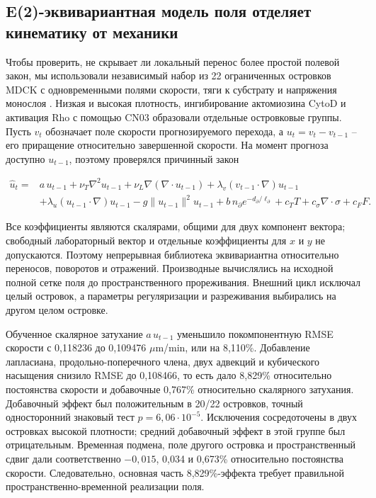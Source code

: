 \documentclass[11pt,a4paper]{article}
\begin{document}
\subsection{E(2)-эквивариантная модель поля отделяет кинематику от механики}
Чтобы проверить, не скрывает ли локальный перенос более простой полевой закон, мы использовали независимый набор из 22 ограниченных островков MDCK с одновременными полями скорости, тяги к субстрату и напряжения монослоя \cite{ref24}. Низкая и высокая плотность, ингибирование актомиозина CytoD и активация Rho с помощью CN03 образовали отдельные островковые группы. Пусть $v_t$ обозначает поле скорости прогнозируемого перехода, а $u_t=v_t-v_{t-1}$ -- его приращение относительно завершенной скорости. На момент прогноза доступно $u_{t-1}$, поэтому проверялся причинный закон

\begin{equation}
\begin{aligned}
\widehat u_t={}&
a\,u_{t-1}
+\nu_T\nabla^2u_{t-1}
+\nu_L\nabla(\nabla\!\cdot u_{t-1})
+\lambda_v(v_{t-1}\!\cdot\nabla)u_{t-1}\\
{}&
+\lambda_u(u_{t-1}\!\cdot\nabla)u_{t-1}
-g\|u_{t-1}\|^2u_{t-1}
+b\,n_\partial e^{-d_\partial/\ell_\partial}
+c_TT+c_\sigma\nabla\!\cdot\sigma+c_FF .
\end{aligned}
\label{eq:field_law}
\end{equation}

Все коэффициенты являются скалярами, общими для двух компонент вектора; свободный лабораторный вектор и отдельные коэффициенты для $x$ и $y$ не допускаются. Поэтому непрерывная библиотека эквивариантна относительно переносов, поворотов и отражений. Производные вычислялись на исходной полной сетке поля до пространственного прореживания. Внешний цикл исключал целый островок, а параметры регуляризации и разреживания выбирались на другом целом островке.

Обученное скалярное затухание $a\,u_{t-1}$ уменьшило покомпонентную RMSE скорости с 0,118236 до 0,109476 $\mu$m/min, или на 8,110\%. Добавление лапласиана, продольно-поперечного члена, двух адвекций и кубического насыщения снизило RMSE до 0,108466, то есть дало 8,829\% относительно постоянства скорости и добавочные 0,767\% относительно скалярного затухания. Добавочный эффект был положительным в 20/22 островков, точный односторонний знаковый тест $p=6{,}06\cdot10^{-5}$. Исключения сосредоточены в двух островках высокой плотности; средний добавочный эффект в этой группе был отрицательным. Временная подмена, поле другого островка и пространственный сдвиг дали соответственно $-0,015$, 0,034 и 0,673\% относительно постоянства скорости. Следовательно, основная часть 8,829\%-эффекта требует правильной пространственно-временной реализации поля.
\end{document}
